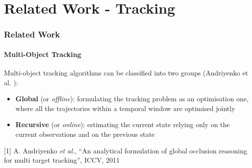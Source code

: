 \section{Related Work - Tracking}

\begin{frame}
	\frametitle{Related Work}
	\framesubtitle{Multi-Object Tracking}
	
	\Large
	
	\vspace{0.6cm}
	
	Multi-object tracking algorithms can be classified into two groups (Andriyenko et al.
	\cite{Andriyenko11}):
	
	\begin{itemize}
		\item \textbf{Global} (or \emph{offline}): formulating the tracking problem as an optimisation
			  one, where all the trajectories within a temporal window are optimised jointly
		\item \textbf{Recursive} (or \emph{online}): estimating the current state relying only on the
			  current observations and on the previous state
	\end{itemize}
	
	\vspace{0.82cm}
	
	\tiny
	
	[1] A. Andriyenko \emph{et al.}, ``An analytical formulation of global occlusion reasoning for
		multi target tracking'', ICCV, 2011
\end{frame}

